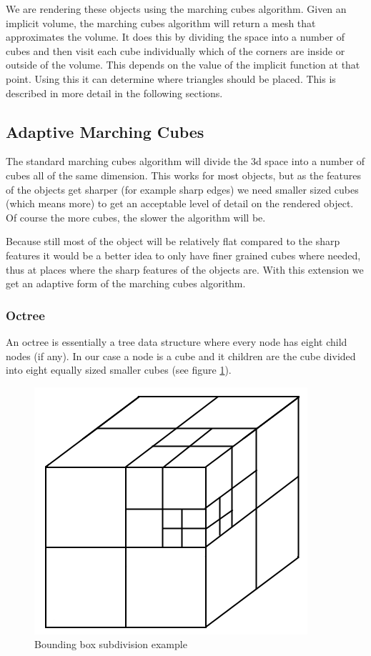 \documentclass[a4wide,10pt,twocolumn]{article}
\begin{document}
We are rendering these objects using the marching cubes algorithm. Given an implicit volume, the marching cubes algorithm will return a mesh that approximates the volume. It does this by dividing the space into a number of cubes and then visit each cube individually which of the corners are inside or outside of the volume. This depends on the value of the implicit function at that point. Using this it can determine where triangles should be placed. This is described in more detail in the following sections.

\subsection{Adaptive Marching Cubes}

The standard marching cubes algorithm will divide the 3d space into a number of cubes all of the same dimension. This works for most objects, but as the features of the objects get sharper (for example sharp edges) we need smaller sized cubes (which means more) to get an acceptable level of detail on the rendered object. Of course the more cubes, the slower the algorithm will be.

Because still most of the object will be relatively flat compared to the sharp features it would be a better idea to only have finer grained cubes where needed, thus at places where the sharp features of the objects are. With this extension we get an adaptive form of the marching cubes algorithm.

\subsubsection{Octree}

An octree is essentially a tree data structure where every node has eight child nodes (if any). In our case a node is a cube and it children are the cube divided into eight equally sized smaller cubes (see figure \ref{figure:octree}).

    \begin{figure}[h]
        \begin{center}
            \includegraphics[scale=0.4]{./images/octree_block}
        \end{center}
        \caption{Bounding box subdivision example}
        \label{figure:octree}
    \end{figure}
\end{document}

